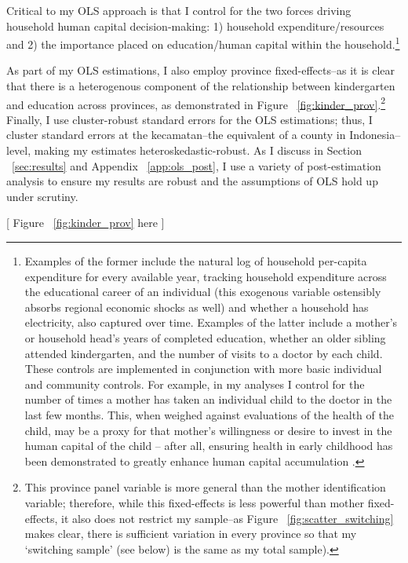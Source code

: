 Critical to my OLS approach is that I control for the two forces driving household human capital decision-making: 1) household expenditure/resources and 2) the importance placed on education/human capital within the household.\footnote{Examples of the former include the natural log of household per-capita expenditure for every available year, tracking household expenditure across the educational career of an individual (this exogenous variable ostensibly absorbs regional economic shocks as well) and whether a household has electricity, also captured over time. Examples of the latter include a mother's or household head's years of completed education, whether an older sibling attended kindergarten, and the number of visits to a doctor by each child. These controls are implemented in conjunction with more basic individual and community controls. For example, in my analyses I control for the number of times a mother has taken an individual child to the doctor in the last few months. This, when weighed against evaluations of the health of the child, may be a proxy for that mother's willingness or desire to invest in the human capital of the child -- after all, ensuring health in early childhood has been demonstrated to greatly enhance human capital accumulation \citep{Attanasio2020}.}

As part of my OLS estimations, I also employ province fixed-effects--as it is clear that there is a heterogenous component of the relationship between kindergarten and education across provinces, as demonstrated in Figure ~\ref{fig:kinder_prov}.\footnote{This province panel variable is more general than the mother identification variable; therefore, while this fixed-effects is less powerful than mother fixed-effects, it also does not restrict my sample--as Figure ~\ref{fig:scatter_switching} makes clear, there is sufficient variation in every province so that my `switching sample' (see below) is the same as my total sample).} Finally, I use cluster-robust standard errors for the OLS estimations; thus, I cluster standard errors at the kecamatan--the equivalent of a county in Indonesia--level, making my estimates heteroskedastic-robust. As I discuss in Section ~\ref{sec:results} and Appendix ~\ref{app:ols_post}, I use a variety of post-estimation analysis to ensure my results are robust and the assumptions of OLS hold up under scrutiny.
\begin{center}
	[ Figure ~\ref{fig:kinder_prov} here ]
\end{center}


